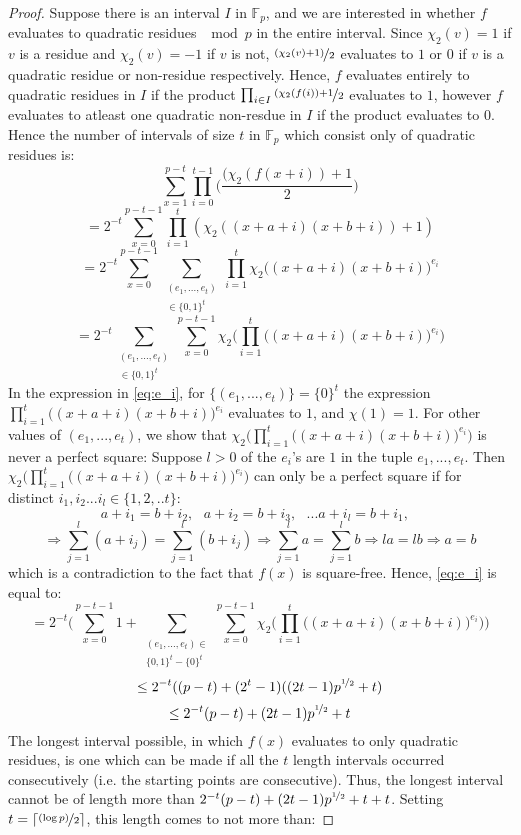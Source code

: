 \documentclass{report}
\begin{document}
\begin{proof}
Suppose there is an interval $I$ in $\mathbb{F}_p$, and we are interested in whether $f$ evaluates to quadratic residues $\mod p$ in the entire interval. Since $\chi_2(v)=1$ if $v$ is a residue and $\chi_2(v)=-1$ if $v$ is not, $\nicefrac{(\chi_2(v)+1)}{2}$ evaluates to $1$ or $0$ if $v$ is a quadratic residue or non-residue respectively. Hence, $f$ evaluates entirely to quadratic residues in $I$ if the product $\prod_{i\in I}\nicefrac{(\chi_2(f(i))+1}{2}$ evaluates to $1$, however $f$ evaluates to atleast one quadratic non-resdue in $I$ if the product evaluates to $0$. Hence the number of intervals of size $t$ in $\mathbb{F}_p$ which consist only of quadratic residues is:
\[ \sum_{x=1}^{p-t}\prod_{i=0}^{t-1}\bigg(\frac{(\chi_2(f(x+i))+1}{2}\bigg) \]
\[ =2^{-t}\sum_{x=0}^{p-t-1}\prod_{i=1}^{t}(\chi_2((x+a+i)(x+b+i))+1) \]
\[ =2^{-t}\sum_{x=0}^{p-t-1}\sum_{\substack{(e_1,...,e_{t})\\ \in\{0,1\}^{t}}}\prod_{i=1}^{t} \chi_2\big((x+a+i)(x+b+i)\big)^{e_i} \]
\begin{equation} \label{eq:e_i}
=2^{-t}\sum_{\substack{(e_1,...,e_{t})\\ \in\{0,1\}^t}}\sum_{x=0}^{p-t-1}\chi_2\Big(\prod_{i=1}^{t} \big((x+a+i)(x+b+i)\big)^{e_i}\Big)
\end{equation}
In the expression in \ref{eq:e_i}, for $\{(e_1,...,e_{t})\}=\{0\}^t$ the expression $\prod_{i=1}^{t} \big((x+a+i)(x+b+i)\big)^{e_i}$ evaluates to $1$, and $\chi(1)=1$. For other values of $(e_1,...,e_{t})$, we show that $\chi_2\Big(\prod_{i=1}^{t} \big((x+a+i)(x+b+i)\big)^{e_i}\Big)$ is never a perfect square: Suppose $l>0$ of the $e_i$'s are $1$ in the tuple $e_1,...,e_t$. Then $\chi_2\Big(\prod_{i=1}^{t} \big((x+a+i)(x+b+i)\big)^{e_i}\Big)$ can only be a perfect square if for distinct $i_1,i_2...i_l\in\{1,2,..t\}$:
\[ a+i_1=b+i_2,\text{ } a+i_2=b+i_3,\text{ } ... a+i_l=b+i_1,\text{ } \]
\[ \Rightarrow \sum_{j=1}^{l} (a + i_j)= \sum_{j=1}^{l} (b + i_j) \Rightarrow \sum_{j=1}^{l} a = \sum_{j=1}^{l} b \Rightarrow la = lb \Rightarrow a = b\]
which is a contradiction to the fact that $f(x)$ is square-free. Hence, \ref{eq:e_i} is equal to:
\[ =2^{-t}\bigg(\sum_{x=0}^{p-t-1}1+ \sum_{\substack{(e_1,...,e_{t})\in \\ \{0,1\}^t-\{0\}^t}} \sum_{x=0}^{p-t-1} \chi_2\Big(\prod_{i=1}^{t} \big((x+a+i)(x+b+i)\big)^{e_i}\Big)\bigg) \]
\[ \leq 2^{-t}((p-t)+(2^{t}-1)((2t-1)p^{\nicefrac{1}{2}}+t) \]
\[ \leq 2^{-t}(p-t)+ (2t-1)p^{\nicefrac{1}{2}}+t \]
The longest interval possible, in which $f(x)$ evaluates to only quadratic residues, is one which can be made if all the $t$ length intervals occurred consecutively (i.e. the starting points are consecutive). Thus, the longest interval cannot be of length more than $2^{-t}(p-t)+ (2t-1) p^ {\nicefrac {1}{2}} +t+t$. Setting $t=\lceil\nicefrac{(\log p)}{2}\rceil$, this length comes to not more than:

\end{proof}
\end{document}
